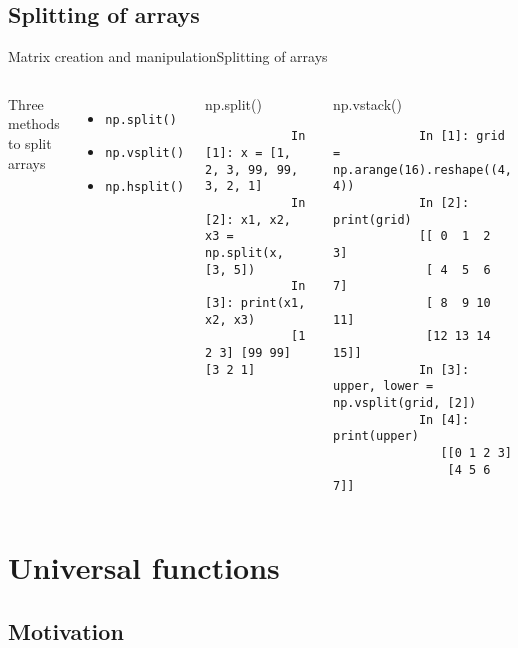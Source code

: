 \documentclass[10pt,compress]{beamer} %
\begin{document}
\subsection{Splitting of arrays}
\begin{frame}[fragile]{Matrix creation and manipulation}{Splitting of arrays}
	\begin{columns}
		Three methods to split arrays
		\begin{itemize}
			\item \texttt{np.split()}
			\item \texttt{np.vsplit()}
			\item \texttt{np.hsplit()}
		\end{itemize}

		\begin{exampleblock}{\footnotesize{np.split()}}
		\vspace{-0.2cm} 
			\begin{lstlisting}
			In [1]: x = [1, 2, 3, 99, 99, 3, 2, 1]
			In [2]: x1, x2, x3 = np.split(x, [3, 5])
			In [3]: print(x1, x2, x3)
			[1 2 3] [99 99] [3 2 1]
			\end{lstlisting}
		\vspace{-0.2cm} 
		\end{exampleblock}

		\begin{exampleblock}{\footnotesize{np.vstack()}}
		\vspace{-0.2cm} 
			\begin{lstlisting}
			In [1]: grid = np.arange(16).reshape((4, 4))
			In [2]: print(grid)
			[[ 0  1  2  3]
			 [ 4  5  6  7]
			 [ 8  9 10 11]
			 [12 13 14 15]]
			In [3]: upper, lower = np.vsplit(grid, [2])
			In [4]: print(upper)
			   [[0 1 2 3]
			    [4 5 6 7]]
			\end{lstlisting}
		\vspace{-0.2cm} 
		\end{exampleblock}
	\end{columns}
\end{frame}

\section{Universal functions}
\subsection{Motivation}
\end{document}
